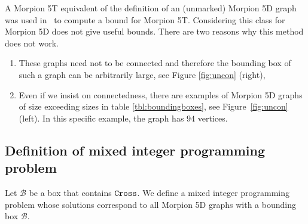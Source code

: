 \begin{remark}
%
A Morpion 5T equivalent of the definition of an (unmarked) Morpion 5D graph was 
  used in~\cite{ijcai} to compute a bound for Morpion 5T.
Considering this class for Morpion 5D  does not give useful bounds. There are two reasons why this method does not work.
\begin{enumerate}
\item These graphs need not to be connected and therefore the bounding box of such a graph
  can be arbitrarily large, see Figure \ref{fig:uncon} (right), 
\item Even if we insist on connectedness, there are examples of Morpion 5D graphs of size exceeding sizes in 
table \ref{tbl:boundingboxes}, see Figure~\ref{fig:uncon} (left). In this specific example, the graph has $94$ vertices.
\end{enumerate}
\end{remark}

\subsection{Definition of mixed integer programming problem}

Let $\mathcal{B}$ be a box that contains $\texttt{Cross}$. 
We define a mixed integer programming problem whose solutions correspond to all Morpion 5D graphs with a bounding 
   box $\mathcal{B}$.
  
\newcommand{\mv}{\operatorname{mv}}
\renewcommand{\dt}{\operatorname{dt}}

